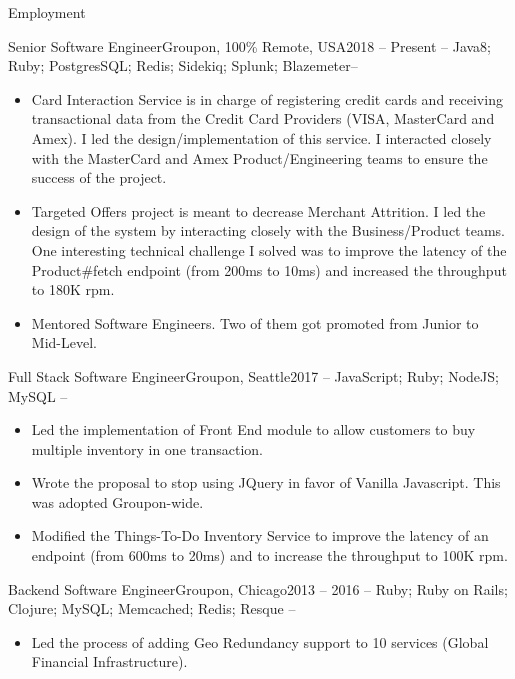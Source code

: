 \documentclass[]{mcdowellcv}
\begin{document}
	\makeheader
	\begin{cvsection}{Employment}
		\begin{cvsubsection}{Senior Software Engineer}{Groupon, 100\% Remote, USA}{2018 -- Present}
			 -- Java8; Ruby; PostgresSQL; Redis; Sidekiq; Splunk; Blazemeter--
			\begin{itemize}
				\item Card Interaction Service is in charge of registering credit cards and receiving transactional data from the Credit Card Providers (VISA, MasterCard and Amex). I led the design/implementation of this service. I interacted closely with the MasterCard and Amex Product/Engineering teams to ensure the success of the project. 
			 	\item Targeted Offers project is meant to decrease Merchant Attrition. I led the design of the system by interacting closely with the Business/Product teams. One interesting technical challenge I solved was to improve the latency of the Product\#fetch endpoint (from 200ms to 10ms) and increased the throughput to 180K rpm.
				\item Mentored Software Engineers. Two of them got promoted from Junior to Mid-Level.
			\end{itemize}
		\end{cvsubsection}
		\begin{cvsubsection}{Full Stack Software Engineer}{Groupon, Seattle}{2017}
			 -- JavaScript; Ruby; NodeJS; MySQL --
			\begin{itemize}
			 	\item Led the implementation of Front End module to allow customers to buy multiple inventory in one transaction. 
				\item Wrote the proposal to stop using JQuery in favor of Vanilla Javascript. This was adopted Groupon-wide. 
				\item Modified the Things-To-Do Inventory Service to improve the latency of an endpoint (from 600ms to 20ms) and to increase the throughput to 100K rpm.
			\end{itemize}
		\end{cvsubsection}
		\begin{cvsubsection}{Backend Software Engineer}{Groupon, Chicago}{2013 -- 2016}
			 -- Ruby; Ruby on Rails; Clojure; MySQL; Memcached; Redis; Resque --
			\begin{itemize}
				\item Led the process of adding Geo Redundancy support to 10 services (Global Financial Infrastructure).

\end{itemize}
\end{cvsubsection}
\end{cvsection}
\end{document}
